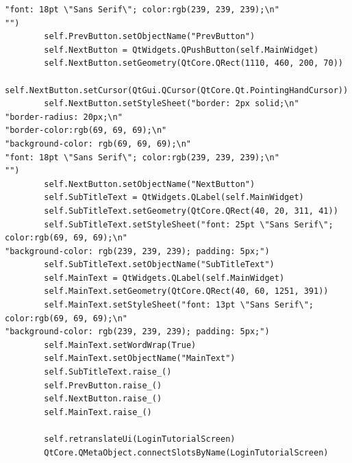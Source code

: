 \documentclass{article}
\begin{document}
\begin{lstlisting}
"font: 18pt \"Sans Serif\"; color:rgb(239, 239, 239);\n"
"")
        self.PrevButton.setObjectName("PrevButton")
        self.NextButton = QtWidgets.QPushButton(self.MainWidget)
        self.NextButton.setGeometry(QtCore.QRect(1110, 460, 200, 70))
        self.NextButton.setCursor(QtGui.QCursor(QtCore.Qt.PointingHandCursor))
        self.NextButton.setStyleSheet("border: 2px solid;\n"
"border-radius: 20px;\n"
"border-color:rgb(69, 69, 69);\n"
"background-color: rgb(69, 69, 69);\n"
"font: 18pt \"Sans Serif\"; color:rgb(239, 239, 239);\n"
"")
        self.NextButton.setObjectName("NextButton")
        self.SubTitleText = QtWidgets.QLabel(self.MainWidget)
        self.SubTitleText.setGeometry(QtCore.QRect(40, 20, 311, 41))
        self.SubTitleText.setStyleSheet("font: 25pt \"Sans Serif\"; color:rgb(69, 69, 69);\n"
"background-color: rgb(239, 239, 239); padding: 5px;")
        self.SubTitleText.setObjectName("SubTitleText")
        self.MainText = QtWidgets.QLabel(self.MainWidget)
        self.MainText.setGeometry(QtCore.QRect(40, 60, 1251, 391))
        self.MainText.setStyleSheet("font: 13pt \"Sans Serif\"; color:rgb(69, 69, 69);\n"
"background-color: rgb(239, 239, 239); padding: 5px;")
        self.MainText.setWordWrap(True)
        self.MainText.setObjectName("MainText")
        self.SubTitleText.raise_()
        self.PrevButton.raise_()
        self.NextButton.raise_()
        self.MainText.raise_()

        self.retranslateUi(LoginTutorialScreen)
        QtCore.QMetaObject.connectSlotsByName(LoginTutorialScreen)


\end{lstlisting}
\end{document}
